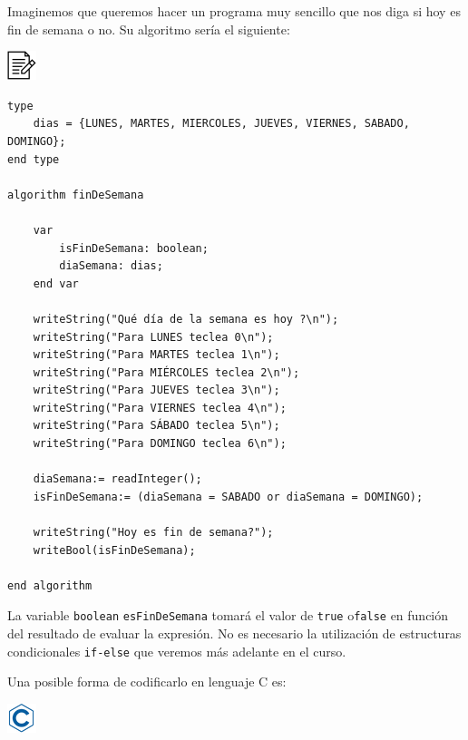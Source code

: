 \documentclass[
]{book}
\begin{document}
Imaginemos que queremos hacer un programa muy sencillo que nos diga si hoy es fin de semana o no. Su algoritmo sería el siguiente:

\includegraphics{./img/alg.png}

\begin{verbatim}
type
    dias = {LUNES, MARTES, MIERCOLES, JUEVES, VIERNES, SABADO, DOMINGO};
end type

algorithm finDeSemana

    var
        isFinDeSemana: boolean;
        diaSemana: dias;
    end var

    writeString("Qué día de la semana es hoy ?\n");
    writeString("Para LUNES teclea 0\n");
    writeString("Para MARTES teclea 1\n");
    writeString("Para MIÉRCOLES teclea 2\n");
    writeString("Para JUEVES teclea 3\n");
    writeString("Para VIERNES teclea 4\n");
    writeString("Para SÁBADO teclea 5\n");
    writeString("Para DOMINGO teclea 6\n");
 
    diaSemana:= readInteger();
    isFinDeSemana:= (diaSemana = SABADO or diaSemana = DOMINGO);

    writeString("Hoy es fin de semana?");
    writeBool(isFinDeSemana);

end algorithm
\end{verbatim}

La variable \texttt{boolean} \texttt{esFinDeSemana} tomará el valor de \texttt{true} o\texttt{false} en función del resultado de evaluar la expresión. No es necesario la utilización de estructuras condicionales \texttt{if-else} que veremos más adelante en el curso.

Una posible forma de codificarlo en lenguaje C es:

\includegraphics{./img/c.png}
\end{document}
